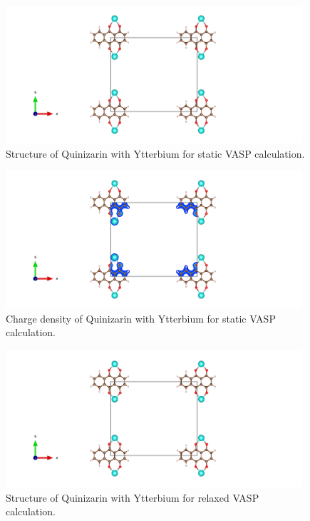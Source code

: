 \documentclass{article}
\begin{document}
  \begin{figure}[H]
      \centering
      \includegraphics[width = 11cm]{../fig/Yb_staticbefore_CONTCAR.png}
      \caption{Structure of Quinizarin with Ytterbium for static VASP calculation. }
      \label{fig:Yb_staticbefore_CONTCAR}
  \end{figure}

  \begin{figure}[H]
      \centering
      \includegraphics[width = 11cm]{../fig/Yb_staticbefore_CHGCAR.png}
      \caption{Charge density of Quinizarin with Ytterbium for static VASP calculation. }
      \label{fig:Yb_staticbefore_CHGCAR}
  \end{figure}

  \begin{figure}[H]
      \centering
      \includegraphics[width = 11cm]{../fig/Yb_relax_CONTCAR.png}
      \caption{Structure of Quinizarin with Ytterbium for relaxed VASP calculation. }
      \label{fig:Yb_relax_CONTCAR}
  \end{figure}
\end{document}
